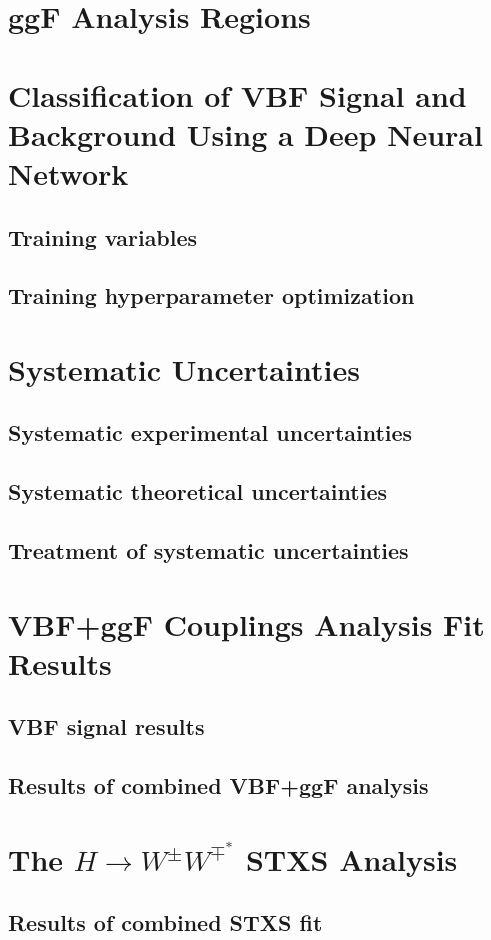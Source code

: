 \section{ggF Analysis Regions}

\section{Classification of VBF Signal and Background Using a Deep Neural Network}
\subsection{Training variables}
\subsection{Training hyperparameter optimization}

\section{Systematic Uncertainties}
\subsection{Systematic experimental uncertainties}
\subsection{Systematic theoretical uncertainties}
\subsection{Treatment of systematic uncertainties}

\section{\HWW VBF+ggF Couplings Analysis Fit Results}
\subsection{VBF signal results}
\subsection{Results of combined VBF+ggF analysis}

\section{The $H\rightarrow W^{\pm}W^{\mp^*}$ STXS Analysis}
\subsection{Results of combined STXS fit}
